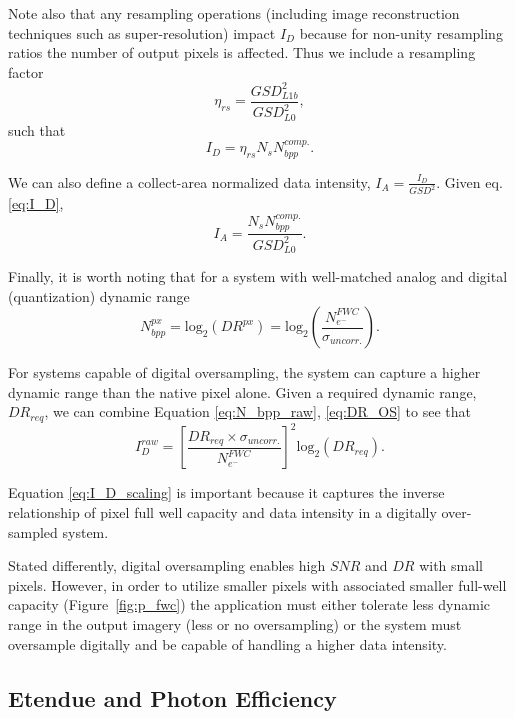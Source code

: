 \documentclass[10pt,journal]{IEEEtran}  %
\begin{document}
Note also that any resampling operations (including image reconstruction techniques such as super-resolution) impact $I_D$ because for non-unity resampling ratios the number of output pixels is affected.  Thus we include a resampling factor
\begin{equation}
    \eta_{rs} = \frac{GSD_{L1b}^2}{GSD_{L0}^2},
\end{equation}
such that
\begin{equation}
    \label{eq:I_D}
    I_D = {\eta}_{rs} N_s N_{bpp}^{comp.}.
\end{equation}

We can also define a collect-area normalized data intensity, $I_A = \frac{I_{D}}{GSD^2}$.  Given eq. \eqref{eq:I_D},
\begin{equation}
    I_A = \frac{N_s N_{bpp}^{comp.}}{GSD_{L0}^2}.
\end{equation}

Finally, it is worth noting that for a system with well-matched analog and digital (quantization) dynamic range
\begin{equation*}
    N_{bpp}^{px} = \textrm{log}_2(DR^{px}) = \textrm{log}_2\left(\frac{N_{e^-}^{FWC}}{\sigma_{uncorr.}}\right)
    \label{eq:N_bpp_raw}.
\end{equation*}

For systems capable of digital oversampling, the system can capture a higher dynamic range than the native pixel alone.  Given a required dynamic range, $DR_{req}$, we can combine Equation \eqref{eq:N_bpp_raw}, \eqref{eq:DR_OS} to see that
\begin{equation}
    \label{eq:I_D_scaling}
    I_D^{raw} = \left[\frac{DR_{req}\times \sigma_{uncorr.}}{N_{e^-}^{FWC}}\right]^2 \textrm{log}_2 (DR_{req}).
\end{equation}

Equation \eqref{eq:I_D_scaling} is important because it captures the inverse relationship of pixel full well capacity and data intensity in a digitally over-sampled system.

Stated differently, digital oversampling enables high $SNR$ and $DR$ with small pixels.  However, in order to utilize smaller pixels with associated smaller full-well capacity (Figure~\ref{fig:p_fwc}) the application must either tolerate less dynamic range in the output imagery (less or no oversampling) or the system must oversample digitally and be capable of handling a higher data intensity.

\subsection{Etendue and Photon Efficiency}
\label{sec:entendue}
\end{document}
